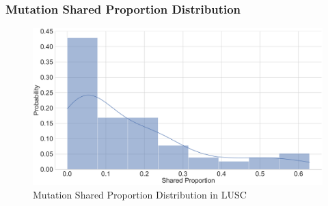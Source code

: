 \documentclass{beamer}
\begin{document}
    \begin{frame}
        \frametitle{Mutation Shared Proportion Distribution}

        \begin{figure}
            \includegraphics[width=0.8 \linewidth]{figures/Mutation_Shared_Proportion/Histogram/BWA.SQC.SharedProportion.pdf}
            \caption{Mutation Shared Proportion Distribution in LUSC}
        \end{figure}
    \end{frame}
\end{document}
